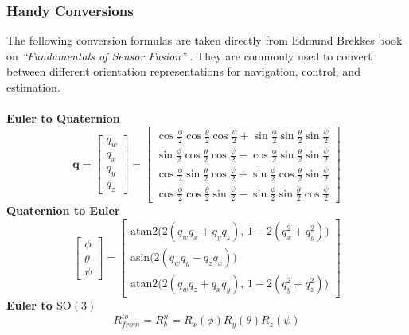 \newpage



\subsubsection{Handy Conversions}
The following conversion formulas are taken directly from Edmund Brekkes book on \textit{``Fundamentals of Sensor Fusion''} \cite{sensor_fusion_book}. They are commonly used to convert between different orientation representations for navigation, control, and estimation.
\\ \\
\textbf{Euler to Quaternion}
$$
    \mathbf{q} =
    \begin{bmatrix}
        q_w \\ q_x \\ q_y \\ q_z
    \end{bmatrix}
    =
    \begin{bmatrix}
        \cos\frac{\phi}{2}\cos\frac{\theta}{2}\cos\frac{\psi}{2} + \sin\frac{\phi}{2}\sin\frac{\theta}{2}\sin\frac{\psi}{2} \\
        \sin\frac{\phi}{2}\cos\frac{\theta}{2}\cos\frac{\psi}{2} - \cos\frac{\phi}{2}\sin\frac{\theta}{2}\sin\frac{\psi}{2} \\
        \cos\frac{\phi}{2}\sin\frac{\theta}{2}\cos\frac{\psi}{2} + \sin\frac{\phi}{2}\cos\frac{\theta}{2}\sin\frac{\psi}{2} \\
        \cos\frac{\phi}{2}\cos\frac{\theta}{2}\sin\frac{\psi}{2} - \sin\frac{\phi}{2}\sin\frac{\theta}{2}\cos\frac{\psi}{2}
    \end{bmatrix}
$$
\textbf{Quaternion to Euler}
$$
    \begin{bmatrix}
        \phi \\ \theta \\ \psi
    \end{bmatrix}
    =
    \begin{bmatrix}
        \text{atan2}\big(2(q_w q_x + q_y q_z),\, 1 - 2(q_x^2 + q_y^2)\big) \\
        \text{asin}\big(2(q_w q_y - q_z q_x)\big) \\
        \text{atan2}\big(2(q_w q_z + q_x q_y),\, 1 - 2(q_y^2 + q_z^2)\big)
    \end{bmatrix}
$$
\textbf{Euler to $\mathrm{SO}(3)$}
$$
    R_{from}^{to} = R_{b}^{n} = R_x(\phi) R_y(\theta) R_z(\psi)
$$
